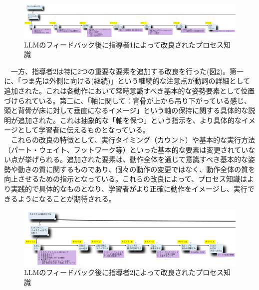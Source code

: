 \begin{figure}[htbp]
    \centering
    \includegraphics[width=1.0\linewidth]{./image/process_knowledge_instructor1_ver2.png}
    \caption{LLMのフィードバック後に指導者1によって改良されたプロセス知識}
    \label{fig:process_knowledge_instructor1_ver2}
\end{figure}

　一方、指導者2は特に2つの重要な要素を追加する改良を行った(図\ref{fig:process_knowledge_instructor2_ver1})。第一に、「つま先は外側に向ける(継続)」という継続的な注意点が動詞の詳細として追加された。これは各動作において常時意識すべき基本的な姿勢要素として位置づけられている。第二に、「軸に関して：背骨が上から吊り下がっている感じ、頭と背骨が床に対して垂直になるイメージ」という軸の保持に関する具体的な説明が追加された。これは抽象的な「軸を保つ」という指示を、より具体的なイメージとして学習者に伝えるものとなっている。\\
　これらの改良の特徴として、実行タイミング（カウント）や基本的な実行方法（パート・ウェイト、フットワーク等）といった基本的な要素は変更されていない点が挙げられる。追加された要素は、動作全体を通じて意識すべき基本的な姿勢や動きの質に関するものであり、個々の動作の変更ではなく、動作全体の質を向上させるための指示となっている。これらの改良によって、プロセス知識はより実践的で具体的なものとなり、学習者がより正確に動作をイメージし、実行できるようになることが期待される。\\

\begin{figure}[htbp]
    \centering
    \includegraphics[width=1.0\linewidth]{./image/process_knowledge_instructor2_ver1.png}
    \caption{LLMのフィードバック後に指導者2によって改良されたプロセス知識}
    \label{fig:process_knowledge_instructor2_ver1}
\end{figure}


